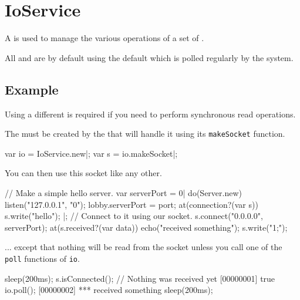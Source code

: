 
\section{IoService}

A  is used to manage the various operations of a set of
.

All  and  are by default using the
default  which is polled regularly by the system.

\subsection{Example}

Using a different  is required if you need to perform
synchronous read operations.

The  must be created by the  that will
handle it using its \lstinline|makeSocket| function.

\begin{urbiscript}
var io = IoService.new|;
var s = io.makeSocket|;
\end{urbiscript}

You can then use this socket like any other.

\begin{urbiscript}
// Make a simple hello server.
var serverPort = 0|
do(Server.new)
{
  listen("127.0.0.1", "0");
  lobby.serverPort = port;
  at(connection?(var s))
  {
    s.write("hello");
  }
}|;
// Connect to it using our socket.
s.connect("0.0.0.0", serverPort);
at(s.received?(var data))
  echo("received something");
s.write("1;");
\end{urbiscript}

... except that nothing will be read from the socket unless you call one of the
\lstinline|poll| functions of \lstinline|io|.

\begin{urbiscript}
sleep(200ms);
s.isConnected(); // Nothing was received yet
[00000001] true
io.poll();
[00000002] *** received something
sleep(200ms);
\end{urbiscript}

